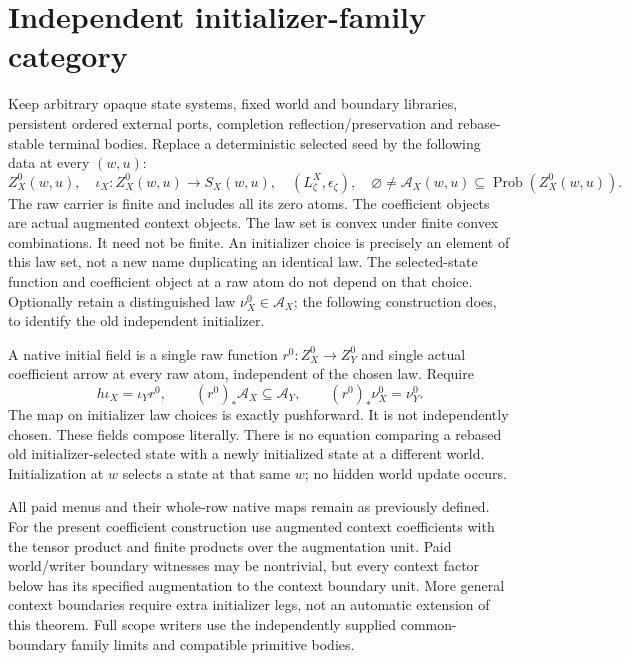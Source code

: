 \documentclass[11pt]{article}
\begin{document}
\section{Independent initializer-family category}
Keep arbitrary opaque state systems, fixed world and boundary libraries, persistent ordered external ports, completion reflection/preservation and rebase-stable terminal bodies. Replace a deterministic selected seed by the following data at every $(w,u)$:
\[
 Z_X^0(w,u),\quad \iota_X:Z_X^0(w,u)\to S_X(w,u),\quad
 (L^X_\zeta,\epsilon_\zeta),\quad
 \varnothing\ne\mathcal A_X(w,u)\subseteq\operatorname{Prob}(Z_X^0(w,u)).
\]
The raw carrier is finite and includes all its zero atoms. The coefficient objects are actual augmented context objects. The law set is convex under finite convex combinations. It need not be finite. An initializer choice is precisely an element of this law set, not a new name duplicating an identical law. The selected-state function and coefficient object at a raw atom do not depend on that choice. Optionally retain a distinguished law $\nu_X^0\in\mathcal A_X$; the following construction does, to identify the old independent initializer.

A native initial field is a single raw function $r^0:Z_X^0\to Z_Y^0$ and single actual coefficient arrow at every raw atom, independent of the chosen law. Require
\[
 h\iota_X=\iota_Yr^0,\qquad (r^0)_*\mathcal A_X\subseteq\mathcal A_Y,
 \qquad (r^0)_*\nu_X^0=\nu_Y^0.
\]
The map on initializer law choices is exactly pushforward. It is not independently chosen. These fields compose literally. There is no equation comparing a rebased old initializer-selected state with a newly initialized state at a different world. Initialization at $w$ selects a state at that same $w$; no hidden world update occurs.

All paid menus and their whole-row native maps remain as previously defined. For the present coefficient construction use augmented context coefficients with the tensor product and finite products over the augmentation unit. Paid world/writer boundary witnesses may be nontrivial, but every context factor below has its specified augmentation to the context boundary unit. More general context boundaries require extra initializer legs, not an automatic extension of this theorem. Full scope writers use the independently supplied common-boundary family limits and compatible primitive bodies.
\end{document}
